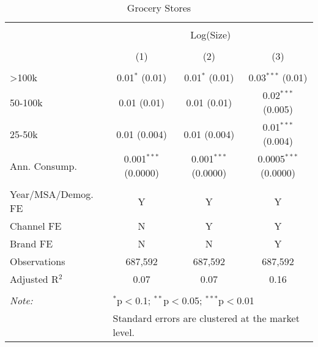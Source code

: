 
\begin{table}[!htbp] \centering 
  \caption{Grocery Stores} 
  \label{tab:packageSizeGroceryDetergent} 
\begin{tabular}{@{\extracolsep{5pt}}lccc} 
\\[-1.8ex]\hline 
\hline \\[-1.8ex] 
 & \multicolumn{3}{c}{Log(Size)} \\ 
\\[-1.8ex] & (1) & (2) & (3)\\ 
\hline \\[-1.8ex] 
 >100k & 0.01$^{*}$ (0.01) & 0.01$^{*}$ (0.01) & 0.03$^{***}$ (0.01) \\ 
  50-100k & 0.01 (0.01) & 0.01 (0.01) & 0.02$^{***}$ (0.005) \\ 
  25-50k & 0.01 (0.004) & 0.01 (0.004) & 0.01$^{***}$ (0.004) \\ 
  Ann. Consump. & 0.001$^{***}$ (0.0000) & 0.001$^{***}$ (0.0000) & 0.0005$^{***}$ (0.0000) \\ 
 \hline \\[-1.8ex] 
Year/MSA/Demog. FE & Y & Y & Y \\ 
Channel FE & N & Y & Y \\ 
Brand FE & N & N & Y \\ 
Observations & 687,592 & 687,592 & 687,592 \\ 
Adjusted R$^{2}$ & 0.07 & 0.07 & 0.16 \\ 
\hline 
\hline \\[-1.8ex] 
\textit{Note:}  & \multicolumn{3}{l}{$^{*}$p$<$0.1; $^{**}$p$<$0.05; $^{***}$p$<$0.01} \\ 
 & \multicolumn{3}{l}{Standard errors are clustered at the market level.} \\ 
\end{tabular} 
\end{table} 

